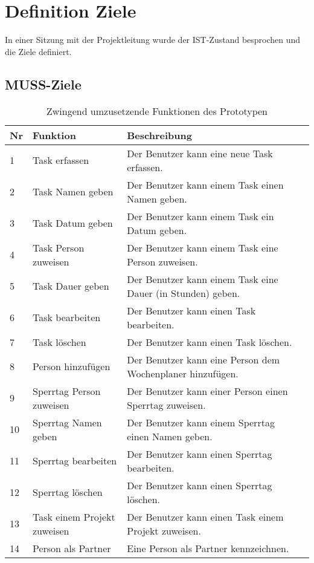 \section{Definition Ziele}
In einer Sitzung mit der Projektleitung wurde der IST-Zustand besprochen und die Ziele definiert.
\clearpage
\subsection{MUSS-Ziele}
\begin{table}[!ht]
\begin{center}
    \begin{tabular}{llp{8cm}l}
        \toprule Nr & Funktion & Beschreibung \\
        \midrule 1 & Task erfassen & Der Benutzer kann eine neue Task erfassen. \\
        \midrule 2 & Task Namen geben & Der Benutzer kann einem Task einen Namen geben. \\
        \midrule 3 & Task Datum geben & Der Benutzer kann einem Task ein Datum geben. \\
        \midrule 4 & Task Person zuweisen & Der Benutzer kann einem Task eine Person zuweisen. \\
        \midrule 5 & Task Dauer geben & Der Benutzer kann einem Task eine Dauer (in Stunden) geben. \\
        \midrule 6 & Task bearbeiten & Der Benutzer kann einen Task bearbeiten. \\ 
        \midrule 7 & Task löschen & Der Benutzer kann einen Task löschen. \\
        \midrule 8 & Person hinzufügen & Der Benutzer kann eine Person dem Wochenplaner hinzufügen. \\
        \midrule 9 & Sperrtag Person zuweisen & Der Benutzer kann einer Person einen Sperrtag zuweisen. \\
        \midrule 10 & Sperrtag Namen geben & Der Benutzer kann einem Sperrtag einen Namen geben. \\
        \midrule 11 & Sperrtag bearbeiten & Der Benutzer kann einen Sperrtag bearbeiten.\\
        \midrule 12 & Sperrtag löschen & Der Benutzer kann einen Sperrtag löschen.\\
        \midrule 13 & Task einem Projekt zuweisen & Der Benutzer kann einen Task einem Projekt zuweisen.\\
        \midrule 14 & Person als Partner & Eine Person als Partner kennzeichnen.\\
        \bottomrule
    \end{tabular}
    \caption{Zwingend umzusetzende Funktionen des Prototypen}
    \label{tab:muss_funktionen}
\end{center}
\end{table}
\clearpage
